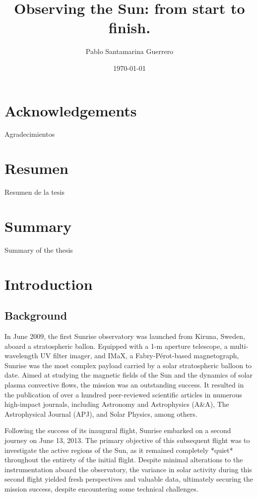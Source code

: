 \documentclass[12pt]{mythesis}
\title{Observing the Sun: from start to finish.}
\author{Pablo Santamarina Guerrero}
\date{\today}
\begin{document}
\frontmatter %
\maketitle
\cleardoublepage

\chapter*{Acknowledgements}

Agradecimientos

\chapter*{Resumen}

Resumen de la tesis

\chapter*{Summary}

Summary of the thesis

\tableofcontents

\mainmatter %
\chapter{Introduction}

\section{Background}

In June 2009, the first Sunrise observatory \citep{SunriseI} was launched from Kiruna, Sweden, aboard a stratospheric ballon. Equipped with a 1-m aperture telescope, a multi-wavelength UV filter imager, and IMaX, a Fabry-Pérot-based magnetograph, Sunrise was the most complex payload carried by a solar stratospheric balloon to date. Aimed at studying the magnetic fields of the Sun and the dynamics of solar plasma convective flows, the mission was an outstanding success. It resulted in the publication of over a hundred peer-reviewed scientific articles in numerous high-impact journals, including Astronomy and Astrophysics (A\&A), The Astrophysical Journal (APJ), and Solar Physics, among others.

Following the success of its inaugural flight, Sunrise embarked on a second journey \citep{SunriseII} on June 13, 2013. The primary objective of this subsequent flight was to investigate the active regions of the Sun, as it remained completely *quiet* throughout the entirety of the initial flight. Despite minimal alterations to the instrumentation aboard the observatory, the variance in solar activity during this second flight yielded fresh perspectives and valuable data, ultimately securing the mission success, despite encountering some technical challenges.
\end{document}
